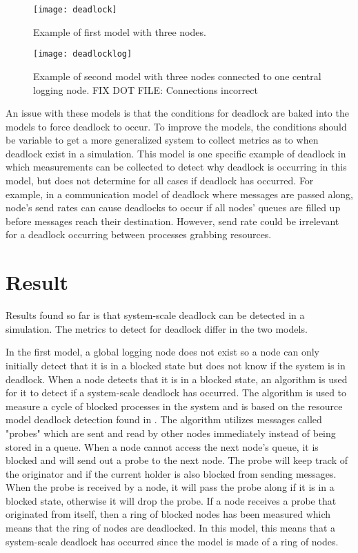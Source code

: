 \documentclass{article}
\begin{document}
\begin{figure}[H]
	\texttt{[image: deadlock]}\newline
	\centering
	\caption{Example of first model with three nodes.}
	\centering
\end{figure}

\begin{figure}[H]
	\texttt{[image: deadlocklog]}\newline
	\centering
	\caption{Example of second model with three nodes connected to one central logging node. FIX DOT FILE: Connections incorrect}
	\centering
\end{figure}

An issue with these models is that the conditions for deadlock are baked into the models to force deadlock to occur. To improve the models, the conditions should be variable to get a more generalized system to collect metrics as to when deadlock exist in a simulation. This model is one specific example of deadlock in which measurements can be collected to detect why deadlock is occurring in this model, but does not determine for all cases if deadlock has occurred. For example, in a communication model of deadlock where messages are passed along, node's send rates can cause deadlocks to occur if all nodes' queues are filled up before messages reach their destination. However, send rate could be irrelevant for a deadlock occurring between processes grabbing resources. 

\section{Result} %

Results found so far is that system-scale deadlock can be detected in a simulation. The metrics to detect for deadlock differ in the two models.

In the first model, a global logging node does not exist so a node can only initially detect that it is in a blocked state but does not know if the system is in deadlock. When a node detects that it is in a blocked state, an algorithm is used for it to detect if a system-scale deadlock has occurred. The algorithm is used to measure a cycle of blocked processes in the system and is based on the resource model deadlock detection found in \cite[p. 149]{1983_Chandy}. The algorithm utilizes messages called "probes" which are sent and read by other nodes immediately instead of being stored in a queue. When a node cannot access the next node's queue, it is blocked and will send out a probe to the next node. The probe will keep track of the originator and if the current holder is also blocked from sending messages. When the probe is received by a node, it will pass the probe along if it is in a blocked state, otherwise it will drop the probe. If a node receives a probe that originated from itself, then a ring of blocked nodes has been measured which means that the ring of nodes are deadlocked. In this model, this means that a system-scale deadlock has occurred since the model is made of a ring of nodes.
\end{document}
